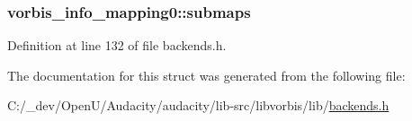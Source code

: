 \subsubsection[{\texorpdfstring{submaps}{submaps}}]{ vorbis\+\_\+info\+\_\+mapping0\+::submaps}\hypertarget{structvorbis__info__mapping0_ac0b282a3786771686ce023fbd9690d58}{}\label{structvorbis__info__mapping0_ac0b282a3786771686ce023fbd9690d58}


Definition at line 132 of file backends.\+h.



The documentation for this struct was generated from the following file\+:\begin{DoxyCompactItemize}
\item 
C\+:/\+\_\+dev/\+Open\+U/\+Audacity/audacity/lib-\/src/libvorbis/lib/\hyperlink{backends_8h}{backends.\+h}\end{DoxyCompactItemize}
